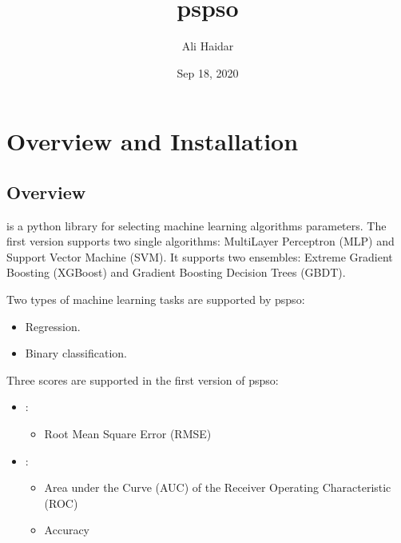 \documentclass[letterpaper,10pt,english]{sphinxmanual}
\title{pspso}
\date{Sep 18, 2020}
\author{Ali Haidar}
\begin{document}
\pagestyle{empty}
\sphinxmaketitle
\pagestyle{plain}
\sphinxtableofcontents
\pagestyle{normal}
\label{\detokenize{index::doc}}




\chapter{Overview and Installation}
\label{\detokenize{index:overview-and-installation}}

\section{Overview}
\label{\detokenize{index:overview}}
 is a python library for selecting machine learning algorithms
parameters. The first version supports two single algorithms:
Multi\sphinxhyphen{}Layer Perceptron (MLP) and Support Vector Machine (SVM). It
supports two ensembles: Extreme Gradient Boosting (XGBoost) and Gradient
Boosting Decision Trees (GBDT).

Two types of machine learning tasks are supported by pspso:
\begin{itemize}
\item {} 
Regression.

\item {} 
Binary classification.

\end{itemize}

Three scores are supported in the first version of pspso:
\begin{itemize}
\item {} 
 :
\begin{itemize}
\item {} 
Root Mean Square Error (RMSE)

\end{itemize}

\item {} 
 :
\begin{itemize}
\item {} 
Area under the Curve (AUC) of the Receiver Operating Characteristic (ROC)

\item {} 
Accuracy

\end{itemize}

\end{itemize}
\end{document}
